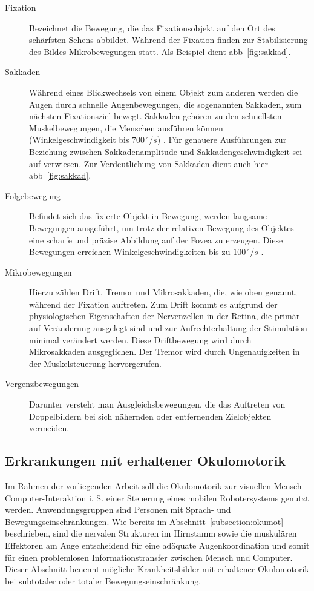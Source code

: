 \begin{description}
\item[Fixation] Bezeichnet die Bewegung, die das Fixationsobjekt auf den Ort des schärfsten Sehens abbildet. Während der Fixation finden zur Stabilisierung des Bildes Mikrobewegungen statt. Als Beispiel dient \acs{abb}~\ref{fig:sakkad}.
\item[Sakkaden] Während eines Blickwechsels von einem Objekt zum anderen werden die Augen durch schnelle Augenbewegungen, die sogenannten Sakkaden, zum nächsten Fixationsziel bewegt. Sakkaden gehören zu den schnellsten Muskelbewegungen, die Menschen ausführen können (Winkelgeschwindigkeit bis $ 700 \,^\circ/s $) \cite{Bondke2014}. Für genauere Ausführungen zur Beziehung zwischen Sakkadenamplitude und Sakkadengeschwindigkeit sei auf \cite[S.12 ff.]{Thoemke2008} verwiesen. Zur Verdeutlichung von Sakkaden dient auch hier \acs{abb}~\ref{fig:sakkad}.
\item[Folgebewegung] Befindet sich das fixierte Objekt in Bewegung, werden langsame Bewegungen ausgeführt, um trotz der relativen Bewegung des Objektes eine scharfe und präzise Abbildung auf der Fovea zu erzeugen. Diese Bewegungen erreichen Winkelgeschwindigkeiten bis zu $100 \,^\circ/s$ \cite[S.30]{Thoemke2008}.
\item[Mikrobewegungen] Hierzu zählen Drift, Tremor und Mikrosakkaden, die, wie oben genannt, während der Fixation auftreten. Zum Drift kommt es aufgrund der physiologischen Eigenschaften der Nervenzellen in der Retina, die primär auf Veränderung ausgelegt sind und zur Aufrechterhaltung der Stimulation minimal verändert werden. Diese Driftbewegung wird durch Mikrosakkaden ausgeglichen. Der Tremor wird durch Ungenauigkeiten in der Muskelsteuerung hervorgerufen.
\item[Vergenzbewegungen] Darunter versteht man Ausgleichsbewegungen, die das Auftreten von Doppelbildern bei sich nähernden oder entfernenden Zielobjekten vermeiden. 
\end{description}

\subsection{Erkrankungen mit erhaltener Okulomotorik}
\label{subsect:erkrank}
Im Rahmen der vorliegenden Arbeit soll die Okulomotorik zur visuellen Mensch-Computer-Interaktion i. S. einer Steuerung eines mobilen Robotersystems genutzt werden. Anwendungsgruppen sind Personen mit Sprach- und Bewegungseinschränkungen. Wie bereits im Abschnitt~\ref{subsection:okumot} beschrieben, sind die nervalen Strukturen im Hirnstamm sowie die muskulären Effektoren am Auge entscheidend für eine adäquate Augenkoordination und somit für einen problemlosen Informationstransfer zwischen Mensch und Computer. Dieser Abschnitt benennt mögliche Krankheitsbilder mit erhaltener Okulomotorik bei subtotaler oder totaler Bewegungseinschränkung.

